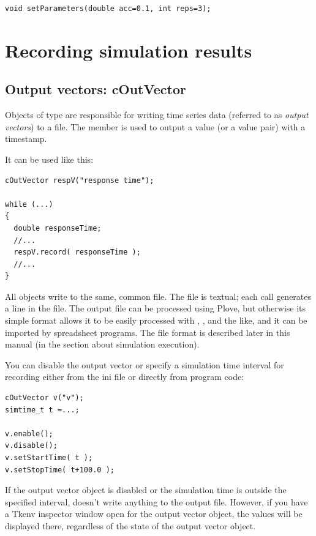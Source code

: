 \begin{verbatim}
void setParameters(double acc=0.1, int reps=3);
\end{verbatim}




\section{Recording simulation results}

\subsection{Output vectors: cOutVector}
\label{sec:ch-sim-lib:coutvector}

Objects of type  are responsible for writing time series
data (referred to as \textit{output vectors}) to a file. The 
member is used to output a value (or a value pair) with a timestamp.

It can be used like this:

\begin{verbatim}
cOutVector respV("response time");

while (...)
{
  double responseTime;
  //...
  respV.record( responseTime );
  //...
}
\end{verbatim}


All  objects write to the same, common file. The
file is textual; each  call generates a line in the
file. The output file can be processed using Plove, but otherwise its
simple format allows it to be easily processed with ,
,  and the like, and it can be imported by
spreadsheet programs.  The file format is described later in this
manual (in the section about simulation execution).

You can disable the output vector or specify a
simulation time interval for recording either from the ini file or
directly from program code:

\begin{verbatim}
cOutVector v("v");
simtime_t t =...;

v.enable();
v.disable();
v.setStartTime( t );
v.setStopTime( t+100.0 );
\end{verbatim}


If the output vector object is disabled or the simulation time is
outside the specified interval,  doesn't write
anything to the output file. However, if you have a Tkenv inspector
window open for the output vector object,
the values will be displayed there, regardless of the state of the
output vector object.





